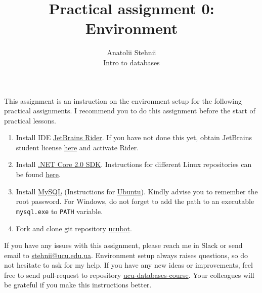 \documentclass[12pt]{article}
\newcommand{\code}[1]{\texttt{#1}}
\begin{document}
\title{Practical assignment 0: Environment}
\author{Anatolii Stehnii\\Intro to databases}
\maketitle

This assignment is an instruction on the environment setup for the following practical assignments. I recommend you to do this assignment before the start of practical lessons.

\begin{enumerate}
\item Install IDE \href{https://www.jetbrains.com/rider/download/}{JetBrains Rider}. If you have not done this yet, obtain JetBrains student license \href{https://www.jetbrains.com/student/}{here} and activate Rider.
\item Install \href{https://www.microsoft.com/net/learn/get-started}{.NET Core 2.0 SDK}. Instructions for different Linux repositories can be found  \href{https://docs.microsoft.com/ru-ru/dotnet/core/linux-prerequisites?tabs=netcore2x}{here}.
\item Install \href{https://www.mysql.com/}{MySQL} (Instructions for \href{https://www.digitalocean.com/community/tutorials/how-to-install-mysql-on-ubuntu-16-04}{Ubuntu}). Kindly advise you to remember the root password. For Windows, do not forget to add the path to an executable \code{mysql.exe} to \code{PATH} variable.
\item Fork and clone git repository \href{https://github.com/tsdaemon/ucubot}{ucubot}.

\end{enumerate}

If you have any issues with this assignment, please reach me in Slack or send email to \href{mailto:stehnii@ucu.edu.ua}{stehnii@ucu.edu.ua}. Environment setup always raises questions, so do not hesitate to ask for my help. If you have any new ideas or improvements, feel free to send pull-request to repository \href{https://github.com/tsdaemon/ucu-databases-course}{ucu-databases-course}. Your colleagues will be grateful if you make this instructions better.
\end{document}
